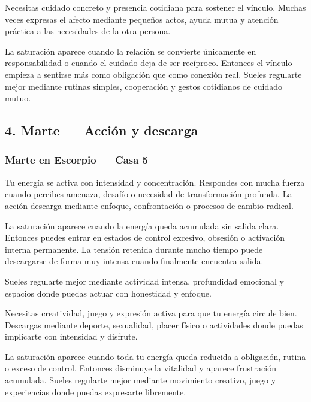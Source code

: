 \documentclass[11pt,a4paper]{article}
\begin{document}
Necesitas cuidado concreto y presencia cotidiana para sostener el vínculo. Muchas veces expresas el afecto mediante pequeños actos, ayuda mutua y atención práctica a las necesidades de la otra persona.

La saturación aparece cuando la relación se convierte únicamente en responsabilidad o cuando el cuidado deja de ser recíproco. Entonces el vínculo empieza a sentirse más como obligación que como conexión real. Sueles regularte mejor mediante rutinas simples, cooperación y gestos cotidianos de cuidado mutuo.

\vspace{0.8cm}

\subsection{4. Marte — Acción y descarga}

\subsubsection*{Marte en Escorpio — Casa 5}

\justifying
Tu energía se activa con intensidad y concentración. Respondes con mucha fuerza cuando percibes amenaza, desafío o necesidad de transformación profunda. La acción descarga mediante enfoque, confrontación o procesos de cambio radical.

La saturación aparece cuando la energía queda acumulada sin salida clara. Entonces puedes entrar en estados de control excesivo, obsesión o activación interna permanente. La tensión retenida durante mucho tiempo puede descargarse de forma muy intensa cuando finalmente encuentra salida.

Sueles regularte mejor mediante actividad intensa, profundidad emocional y espacios donde puedas actuar con honestidad y enfoque.

Necesitas creatividad, juego y expresión activa para que tu energía circule bien. Descargas mediante deporte, sexualidad, placer físico o actividades donde puedas implicarte con intensidad y disfrute.

La saturación aparece cuando toda tu energía queda reducida a obligación, rutina o exceso de control. Entonces disminuye la vitalidad y aparece frustración acumulada. Sueles regularte mejor mediante movimiento creativo, juego y experiencias donde puedas expresarte libremente.
\end{document}
